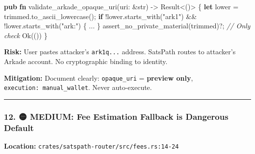 \documentclass[
]{article}
\newenvironment{Shaded}{}{}
\newcommand{\CommentTok}[1]{\textcolor[rgb]{0.38,0.63,0.69}{\textit{#1}}}
\newcommand{\ConstantTok}[1]{\textcolor[rgb]{0.53,0.00,0.00}{#1}}
\newcommand{\ControlFlowTok}[1]{\textcolor[rgb]{0.00,0.44,0.13}{\textbf{#1}}}
\newcommand{\DataTypeTok}[1]{\textcolor[rgb]{0.56,0.13,0.00}{#1}}
\newcommand{\DecValTok}[1]{\textcolor[rgb]{0.25,0.63,0.44}{#1}}
\newcommand{\KeywordTok}[1]{\textcolor[rgb]{0.00,0.44,0.13}{\textbf{#1}}}
\newcommand{\NormalTok}[1]{#1}
\newcommand{\OperatorTok}[1]{\textcolor[rgb]{0.40,0.40,0.40}{#1}}
\newcommand{\StringTok}[1]{\textcolor[rgb]{0.25,0.44,0.63}{#1}}
\begin{document}
\begin{Shaded}
\begin{Highlighting}[]
\KeywordTok{pub} \KeywordTok{fn}\NormalTok{ validate\_arkade\_opaque\_uri(uri}\OperatorTok{:} \OperatorTok{\&}\DataTypeTok{str}\NormalTok{) }\OperatorTok{{-}\textgreater{}} \DataTypeTok{Result}\OperatorTok{\textless{}}\NormalTok{()}\OperatorTok{\textgreater{}} \OperatorTok{\{}
    \KeywordTok{let}\NormalTok{ lower }\OperatorTok{=}\NormalTok{ trimmed}\OperatorTok{.}\NormalTok{to\_ascii\_lowercase()}\OperatorTok{;}
    \ControlFlowTok{if} \OperatorTok{!}\NormalTok{lower}\OperatorTok{.}\NormalTok{starts\_with(}\StringTok{"ark1"}\NormalTok{) }\OperatorTok{\&\&} \OperatorTok{!}\NormalTok{lower}\OperatorTok{.}\NormalTok{starts\_with(}\StringTok{"ark:"}\NormalTok{) }\OperatorTok{\{} \OperatorTok{...} \OperatorTok{\}}
\NormalTok{    assert\_no\_private\_material(trimmed)}\OperatorTok{?;}  \CommentTok{// Only check}
    \ConstantTok{Ok}\NormalTok{(())}
\OperatorTok{\}}
\end{Highlighting}
\end{Shaded}

\textbf{Risk:} User pastes attacker's \texttt{ark1q...} address.
SatsPath routes to attacker's Arkade account. No cryptographic binding
to identity.

\textbf{Mitigation:} Document clearly: \texttt{opaque\_uri} =
\textbf{preview only}, \texttt{execution:\ manual\_wallet}. Never
auto-execute.

\begin{center}\rule{0.5\linewidth}{0.5pt}\end{center}

\hypertarget{medium-fee-estimation-fallback-is-dangerous-default}{%
\subsubsection{12. 🟡 MEDIUM: Fee Estimation Fallback is Dangerous
Default}\label{medium-fee-estimation-fallback-is-dangerous-default}}

\textbf{Location:} \texttt{crates/satspath-router/src/fees.rs:14-24}

\begin{Shaded}
\end{Shaded}
\end{document}
